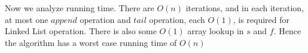 \documentclass[11pt]{article}
\begin{document}
\begin{enumerate}
   Now we analyze running time. There are $O(n)$ iterations, and in each iteration, at most one $append$ operation and $tail$ operation, each $O(1)$, is required for Linked List operation. There is also some $O(1)$ array lookup in $s$ and $f$. Hence the algorithm has a worst case running time of $O(n)$

   

\end{enumerate}
\end{document}
